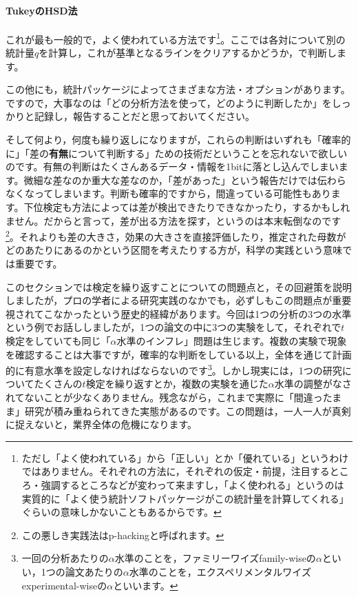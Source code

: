 \documentclass{ltjsarticle}
\begin{document}
\paragraph{TukeyのHSD法}これが最も一般的で，よく使われている方法です\footnote{ただし「よく使われている」から「正しい」とか「優れている」というわけではありません。それぞれの方法に，それぞれの仮定・前提，注目するところ・強調するところなどが変わって来ますし，「よく使われる」というのは実質的に「よく使う統計ソフトパッケージがこの統計量を計算してくれる」ぐらいの意味しかないこともあるからです。}。ここでは各対について別の統計量$q$を計算し，これが基準となるラインをクリアするかどうか，で判断します。

この他にも，統計パッケージによってさまざまな方法・オプションがあります。ですので，大事なのは「どの分析方法を使って，どのように判断したか」をしっかりと記録し，報告することだと思っておいてください。

そして何より，何度も繰り返しになりますが，これらの判断はいずれも「確率的に」「差の\textbf{有無}について判断する」ための技術だということを忘れないで欲しいのです。有無の判断はたくさんあるデータ・情報を1bitに落とし込んでしまいます。微細な差なのか重大な差なのか，「差があった」という報告だけでは伝わらなくなってしまいます。判断も確率的ですから，間違っている可能性もあります。下位検定も方法によっては差が検出できたりできなかったり，するかもしれません。だからと言って，差が出る方法を探す，というのは本末転倒なのです\footnote{この悪しき実践法はp-hackingと呼ばれます。}。それよりも差の大きさ，効果の大きさを直接評価したり，推定された母数がどのあたりにあるのかという区間を考えたりする方が，科学の実践という意味では重要です。

このセクションでは検定を繰り返すことについての問題点と，その回避策を説明しましたが，プロの学者による研究実践のなかでも，必ずしもこの問題点が重要視されてこなかったという歴史的経緯があります。今回は1つの分析の3つの水準という例でお話ししましたが，1つの論文の中に3つの実験をして，それぞれで$t$検定をしていても同じ「$\alpha$水準のインフレ」問題は生じます。複数の実験で現象を確認することは大事ですが，確率的な判断をしている以上，全体を通じて計画的に有意水準を設定しなければならないのです\footnote{一回の分析あたりの$\alpha$水準のことを，ファミリーワイズfamily-wiseの$\alpha$といい，1つの論文あたりの$\alpha$水準のことを，エクスペリメンタルワイズexperimental-wiseの$\alpha$といいます。}。しかし現実には，1つの研究についてたくさんの$t$検定を繰り返すとか，複数の実験を通じた$\alpha$水準の調整がなされてないことが少なくありません。残念ながら，これまで実際に「間違ったまま」研究が積み重ねられてきた実態があるのです。この問題は，一人一人が真剣に捉えないと，業界全体の危機になります。
\end{document}
